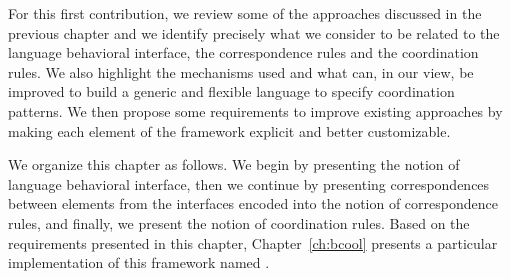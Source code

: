 For this first contribution, we review some of the approaches discussed in the previous chapter and we identify precisely what we consider to be related to the language behavioral interface, the correspondence rules and the coordination rules. We also highlight the mechanisms used and what can, in our view, be improved to build a generic and flexible language to specify coordination patterns. We then propose some requirements to improve existing approaches by making each element of the framework explicit and better customizable.  

We organize this chapter as follows. We begin by presenting the notion of language behavioral interface, then we continue by presenting correspondences between elements from the interfaces encoded into the notion of correspondence rules, and finally, we present the notion of coordination rules. Based on the requirements presented in this chapter, Chapter~\ref{ch:bcool} presents a particular implementation of this framework named \bcool.

